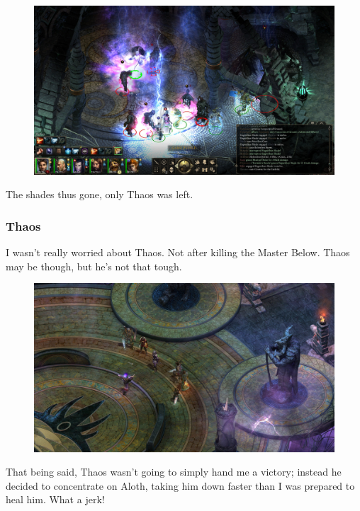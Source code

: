 \documentclass{article}
\begin{document}
\begin{figure}
\includegraphics[scale=0.33]{files/blog/2019_03_17_pillars_of_eternity_path_of_the_damned_act_iv/2019_03_17_sun_in_shadow2.jpg}
\end{figure}

The shades thus gone, only Thaos was left.

\subsubsection{Thaos}

I wasn't really worried about Thaos.  Not after killing the Master Below.  Thaos may be though, but he's not that tough.

\begin{figure}
\includegraphics[scale=0.33]{files/blog/2019_03_17_pillars_of_eternity_path_of_the_damned_act_iv/2019_03_17_thaos0.jpg}
\end{figure}

That being said, Thaos wasn't going to simply hand me a victory; instead he decided to concentrate on Aloth, taking him down faster than I was prepared to heal him.  What a jerk!
\end{document}
